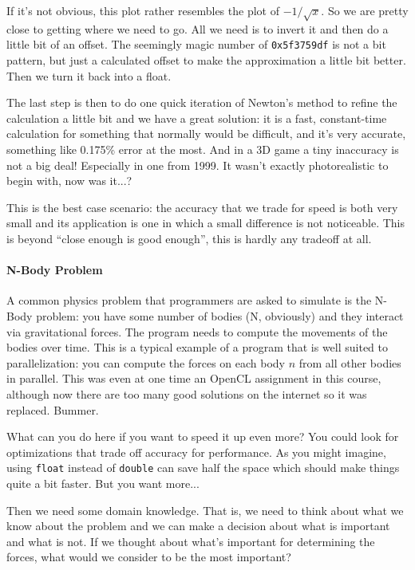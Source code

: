 \documentclass[a4paper]{report}
\begin{document}
If it's not obvious, this plot rather resembles the plot of $-1/\sqrt{x}$. So we are pretty close to getting where we need to go. All we need is to invert it and then do a little bit of an offset. The seemingly magic number of \texttt{0x5f3759df} is not a bit pattern, but just a calculated offset to make the approximation a little bit better. Then we turn it back into a float.

The last step is then to do one quick iteration of Newton's method to refine the calculation a little bit and we have a great solution: it is a fast, constant-time calculation for something that normally would be difficult, and it's very accurate, something like 0.175\% error at the most. And in a 3D game a tiny inaccuracy is not a big deal! Especially in one from 1999. It wasn't exactly photorealistic to begin with, now was it...?

This is the best case scenario: the accuracy that we trade for speed is both very small and its application is one in which a small difference is not noticeable. This is beyond ``close enough is good enough'', this is hardly any tradeoff at all.


\paragraph{N-Body Problem}
A common physics problem that programmers are asked to simulate is the N-Body problem: you have some number of bodies (N, obviously) and they interact via gravitational forces. The program needs to compute the movements of the bodies over time. This is a typical example of a program that is well suited to parallelization: you can compute the forces on each body $n$ from all other bodies in parallel. This was even at one time an OpenCL assignment in this course, although now there are too many good solutions on the internet so it was replaced. Bummer.

What can you do here if you want to speed it up even more? You could look for optimizations that trade off accuracy for performance. As you might imagine, using \texttt{float} instead of \texttt{double} can save half the space which should make things quite a bit faster. But you want more...

Then we need some domain knowledge. That is, we need to think about what we know about the problem and we can make a decision about what is important and what is not. If we thought about what's important for determining the forces, what would we consider to be the most important? 
\end{document}

